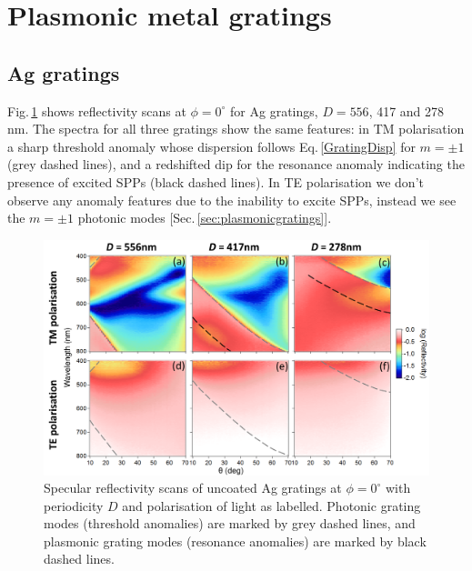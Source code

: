 \section{Plasmonic metal gratings}

\subsection{Ag gratings}
Fig.\,\ref{7Fig7} shows reflectivity scans at $\phi=0^{\circ}$ for Ag gratings, $D=556$, 417 and 278\,nm. The spectra for all three gratings show the same features: in TM polarisation a sharp threshold anomaly whose dispersion follows Eq.\,\ref{GratingDisp} for $m=\pm1$ (grey dashed lines), and a redshifted dip for the resonance anomaly indicating the presence of excited SPPs (black dashed lines). In TE polarisation we don't observe any anomaly features due to the inability to excite SPPs, instead we see the $m=\pm1$ photonic modes [Sec.\,\ref{sec:plasmonicgratings}].
\begin{figure}[h!] 
\centering    
\includegraphics[width=\textwidth]{Fig7}
\caption[TM and TE specular reflectivity scans of uncoated Ag gratings at $\phi=0^{\circ}$, $D=556$, 417 and 278\,nm.]{Specular reflectivity scans of uncoated Ag gratings at $\phi=0^{\circ}$ with periodicity $D$ and polarisation of light as labelled. Photonic grating modes (threshold anomalies) are marked by grey dashed lines, and plasmonic grating modes (resonance anomalies) are marked by black dashed lines.}
\label{7Fig7}
\end{figure}

